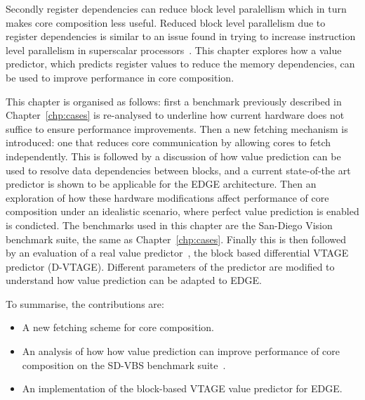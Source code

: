 Secondly register dependencies can reduce block level paralellism which in turn makes core composition less useful.
Reduced block level parallelism due to register dependencies is similar to an issue found in trying to increase instruction level parallelism in superscalar processors~\cite{peraisBeBop2015}.
This chapter explores how a value predictor, which predicts register values to reduce the memory dependencies, can be used to improve performance in core composition.

This chapter is organised as follows: first a benchmark previously described in Chapter~\ref{chp:cases} is re-analysed to underline how current hardware does not suffice to ensure performance improvements.
Then a new fetching mechanism is introduced: one that reduces core communication by allowing cores to fetch independently.
This is followed by a discussion of how value prediction can be used to resolve data dependencies between blocks, and a current state-of-the art predictor is shown to be applicable for the EDGE architecture.
Then an exploration of how these hardware modifications affect performance of core composition under an idealistic scenario, where perfect value prediction is enabled is condicted.
The benchmarks used in this chapter are the San-Diego Vision benchmark suite, the same as Chapter~\ref{chp:cases}.
Finally this is then followed by an evaluation of a real value predictor~\cite{peraisBeBop2015}, the block based differential VTAGE predictor (D-VTAGE).
Different parameters of the predictor are modified to understand how value prediction can be adapted to EDGE.

To summarise, the contributions are:

\vspace{-1em}
\begin{itemize}
\item A new fetching scheme for core composition.
\vspace{-1em}
\item An analysis of how how value prediction can improve performance of core composition on the SD-VBS benchmark suite~\cite{sdvbs}.
\item An implementation of the block-based VTAGE value predictor for EDGE.
\end{itemize}